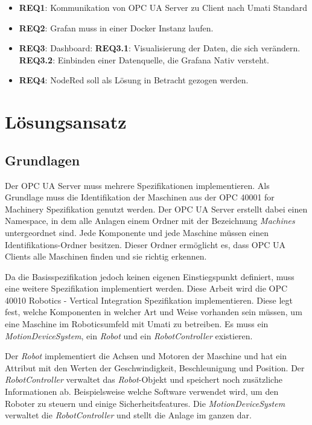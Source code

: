 \documentclass[a4paper, 12pt, oneside, toc=listofnumbered, bibliography=totoc]{scrbook}
\begin{document}
		\begin{itemize}
			\item \textbf{REQ1}: Kommunikation von OPC UA Server zu Client nach Umati Standard
			\item \textbf{REQ2}: Grafan muss in einer Docker Instanz laufen.
			\item \textbf{REQ3}: Dashboard:
			\subitem \textbf{REQ3.1}: Visualisierung der Daten, die sich verändern.
			\subitem \textbf{REQ3.2}: Einbinden einer Datenquelle, die Grafana Nativ versteht.
			\item \textbf{REQ4}: NodeRed soll als Lösung in Betracht gezogen werden.
		\end{itemize}			
		
	\section{Lösungsansatz}
	
		\subsection{Grundlagen}
		Der OPC UA Server muss mehrere Spezifikationen implementieren. Als Grundlage muss die Identifikation der Maschinen aus der OPC 40001 for Machinery Spezifikation genutzt werden. Der OPC UA Server erstellt dabei einen Namespace, in dem alle Anlagen einem Ordner mit der Bezeichnung \textit{Machines} untergeordnet sind. Jede Komponente und jede Maschine müssen einen Identifikations-Ordner besitzen. Dieser Ordner ermöglicht es, dass OPC UA Clients alle Maschinen finden und sie richtig erkennen. 
		
		Da die Basisspezifikation jedoch keinen eigenen Einstiegspunkt definiert, muss eine weitere Spezifikation implementiert werden. Diese Arbeit wird die OPC 40010 Robotics - Vertical Integration Spezifikation implementieren. Diese legt fest, welche Komponenten in welcher Art und Weise vorhanden sein müssen, um eine Maschine im Roboticsumfeld mit Umati zu betreiben. Es muss ein \textit{MotionDeviceSystem}, ein \textit{Robot} und ein \textit{RobotController} existieren. 
		
		Der \textit{Robot} implementiert die Achsen und Motoren der Maschine und hat ein Attribut mit den Werten der Geschwindigkeit, Beschleunigung und Position. Der \textit{RobotController} verwaltet das \textit{Robot}-Objekt und speichert noch zusätzliche Informationen ab. Beispielsweise welche Software verwendet wird, um den Roboter zu steuern und einige Sicherheitsfeatures. Die \textit{MotionDeviceSystem} verwaltet die \textit{RobotController} und stellt die Anlage im ganzen dar.
		
\end{document}
